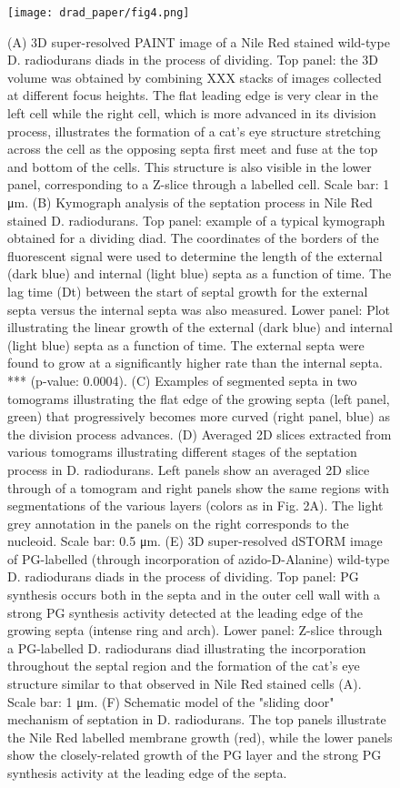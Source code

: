 \begin{figure}[ht]
    \centering
    \texttt{[image: drad\_paper/fig4.png]}
    \label{drad_fig4}
\end{figure}
\begin{figure}[ht]
    \ContinuedFloat
    \caption[]{(A) 3D super-resolved PAINT image of a Nile Red stained wild-type D. radiodurans diads in the process of dividing. Top panel: the 3D volume was obtained by combining XXX stacks of images collected at different focus heights. The flat leading edge is very clear in the left cell while the right cell, which is more advanced in its division process, illustrates the formation of a cat's eye structure stretching across the cell as the opposing septa first meet and fuse at the top and bottom of the cells. This structure is also visible in the lower panel, corresponding to a Z-slice through a labelled cell. Scale bar: 1 μm. (B) Kymograph analysis of the septation process in Nile Red stained D. radiodurans. Top panel: example of a typical kymograph obtained for a dividing diad. The coordinates of the borders of the fluorescent signal were used to determine the length of the external (dark blue) and internal (light blue) septa as a function of time. The lag time (Dt) between the start of septal growth for the external septa versus the internal septa was also measured. Lower panel: Plot illustrating the linear growth of the external (dark blue) and internal (light blue) septa as a function of time. The external septa were found to grow at a significantly higher rate than the internal septa. *** (p-value: 0.0004). (C) Examples of segmented septa in two tomograms illustrating the flat edge of the growing septa (left panel, green) that progressively becomes more curved (right panel, blue) as the division process advances. (D) Averaged 2D slices extracted from various tomograms illustrating different stages of the septation process in D. radiodurans. Left panels show an averaged 2D slice through of a tomogram and right panels show the same regions with segmentations of the various layers (colors as in Fig. 2A). The light grey annotation in the panels on the right corresponds to the nucleoid. Scale bar: 0.5 μm. (E) 3D super-resolved dSTORM image of PG-labelled (through incorporation of azido-D-Alanine) wild-type D. radiodurans diads in the process of dividing. Top panel: PG synthesis occurs both in the septa and in the outer cell wall with a strong PG synthesis activity detected at the leading edge of the growing septa (intense ring and arch). Lower panel: Z-slice through a PG-labelled D. radiodurans diad illustrating the incorporation throughout the septal region and the formation of the cat's eye structure similar to that observed in Nile Red stained cells (A). Scale bar: 1 μm. (F) Schematic model of the "sliding door" mechanism of septation in D. radiodurans. The top panels illustrate the Nile Red labelled membrane growth (red), while the lower panels show the closely-related growth of the PG layer and the strong PG synthesis activity at the leading edge of the septa.}
\end{figure}

